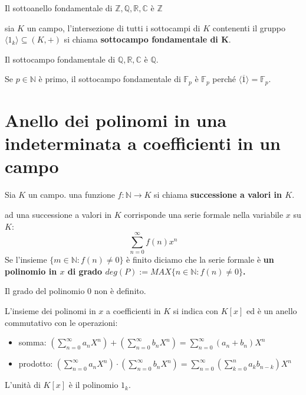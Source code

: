 \documentclass[../main.tex]{subfiles}
\begin{document}
\begin{example}
    Il sottoanello fondamentale di $\mathbb{Z},\mathbb{Q},\mathbb{R},\mathbb{C}$ è $\mathbb{Z}$
\end{example}

\begin{definition}
    sia $K$ un campo, l'intersezione di tutti i sottocampi di $K$ contenenti il gruppo $\langle1_k\rangle \subseteq (K,+)$ si chiama \textbf{sottocampo fondamentale di K}.
\end{definition}

\begin{example}
    Il sottocampo fondamentale di $\mathbb{Q},\mathbb{R},\mathbb{C}$ è $\mathbb{Q}$.

    Se $p \in \mathbb{N}$ è primo, il sottocampo fondamentale di $\mathbb{F}_p$ è $\mathbb{F}_p$ perché $\langle\overline{1}\rangle = \mathbb{F}_p$.
\end{example}

\section{Anello dei polinomi in una indeterminata a coefficienti in un campo}
\begin{definition}
    Sia $K$ un campo. una funzione $f: \mathbb{N} \rightarrow K$ si chiama \textbf{successione a valori in $K$}.
\end{definition}
ad una successione a valori in $K$ corrisponde una serie formale nella variabile $x$ su $K$:
\begin{equation*}
    \sum_{n=0}^{\infty} f(n) x^n
\end{equation*}
Se l'insieme $\{ m \in \mathbb{N} : f(n) \neq 0\}$ è finito diciamo che la serie formale è \textbf{un polinomio in $x$ di grado $deg(P) := MAX \{ n \in \mathbb{N}: f(n) \neq 0\}$.} 

Il grado del polinomio 0 non è definito.

L'insieme dei polinomi in $x$ a coefficienti in $K$ si indica con $K[x]$ ed è un anello commutativo con le operazioni:
\begin{itemize}
    \item somma: $(\sum_{n=0}^{\infty} a_n X^n) + (\sum_{n=0}^{\infty} b_n X^n) = \sum_{n=0}^{\infty} (a_n + b_n) X^n$
    \item prodotto: $(\sum_{n=0}^{\infty} a_n X^n) \cdot (\sum_{n=0}^{\infty} b_n X^n) = \sum_{n=0}^{\infty} (\sum_{k=0}^{n} a_k b_{n-k}) X^n$
\end{itemize}
L'unità di $K[x]$ è il polinomio $1_k$.
\end{document}
